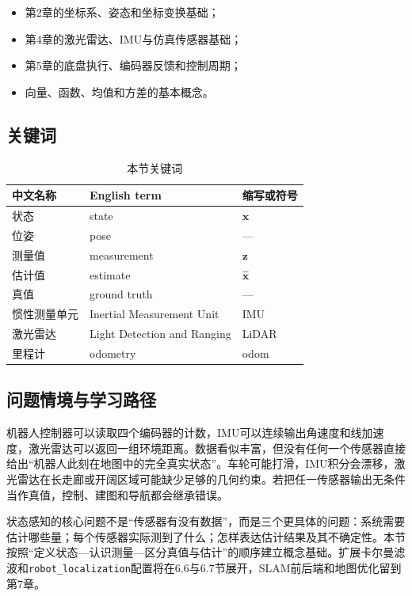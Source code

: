 \documentclass[UTF8,zihao=-4]{ctexart}
\newcommand{\vect}[1]{\bm{#1}}
\begin{document}
\begin{itemize}
  \item 第2章的坐标系、姿态和坐标变换基础；
  \item 第4章的激光雷达、IMU与仿真传感器基础；
  \item 第5章的底盘执行、编码器反馈和控制周期；
  \item 向量、函数、均值和方差的基本概念。
\end{itemize}

\subsection*{关键词}

\begin{table}[htbp]
  \centering
  \caption*{本节关键词}
  \begin{tabular}{lll}
    \toprule
    中文名称 & English term & 缩写或符号 \\
    \midrule
    状态 & state & $\vect{x}$ \\
    位姿 & pose & --- \\
    测量值 & measurement & $\vect{z}$ \\
    估计值 & estimate & $\hat{\vect{x}}$ \\
    真值 & ground truth & --- \\
    惯性测量单元 & Inertial Measurement Unit & IMU \\
    激光雷达 & Light Detection and Ranging & LiDAR \\
    里程计 & odometry & odom \\
    \bottomrule
  \end{tabular}
\end{table}

\subsection*{问题情境与学习路径}

机器人控制器可以读取四个编码器的计数，IMU可以连续输出角速度和线加速度，激光雷达可以返回一组环境距离。数据看似丰富，但没有任何一个传感器直接给出“机器人此刻在地图中的完全真实状态”。车轮可能打滑，IMU积分会漂移，激光雷达在长走廊或开阔区域可能缺少足够的几何约束。若把任一传感器输出无条件当作真值，控制、建图和导航都会继承错误。

状态感知的核心问题不是“传感器有没有数据”，而是三个更具体的问题：系统需要估计哪些量；每个传感器实际测到了什么；怎样表达估计结果及其不确定性。本节按照“定义状态---认识测量---区分真值与估计”的顺序建立概念基础。扩展卡尔曼滤波和\texttt{robot\_localization}配置将在6.6与6.7节展开，SLAM前后端和地图优化留到第7章。
\end{document}
